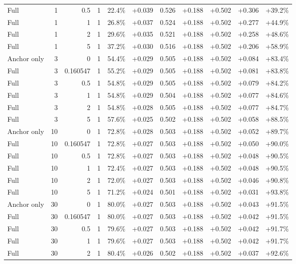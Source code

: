 \begin{table}[htbp]
\begin{tabular}{lrrrccccccc}
Full & 1 & 0.5 & 1 & 22.4\% & +0.039 & 0.526 & +0.188 & +0.502 & +0.306 & +39.2\% \\
Full & 1 & 1 & 1 & 26.8\% & +0.037 & 0.524 & +0.188 & +0.502 & +0.277 & +44.9\% \\
Full & 1 & 2 & 1 & 29.6\% & +0.035 & 0.521 & +0.188 & +0.502 & +0.258 & +48.6\% \\
Full & 1 & 5 & 1 & 37.2\% & +0.030 & 0.516 & +0.188 & +0.502 & +0.206 & +58.9\% \\
Anchor only & 3 & 0 & 1 & 54.4\% & +0.029 & 0.505 & +0.188 & +0.502 & +0.084 & +83.4\% \\
Full & 3 & 0.160547 & 1 & 55.2\% & +0.029 & 0.505 & +0.188 & +0.502 & +0.081 & +83.8\% \\
Full & 3 & 0.5 & 1 & 54.8\% & +0.029 & 0.505 & +0.188 & +0.502 & +0.079 & +84.2\% \\
Full & 3 & 1 & 1 & 54.8\% & +0.029 & 0.504 & +0.188 & +0.502 & +0.077 & +84.6\% \\
Full & 3 & 2 & 1 & 54.8\% & +0.028 & 0.505 & +0.188 & +0.502 & +0.077 & +84.7\% \\
Full & 3 & 5 & 1 & 57.6\% & +0.025 & 0.502 & +0.188 & +0.502 & +0.058 & +88.5\% \\
Anchor only & 10 & 0 & 1 & 72.8\% & +0.028 & 0.503 & +0.188 & +0.502 & +0.052 & +89.7\% \\
Full & 10 & 0.160547 & 1 & 72.8\% & +0.027 & 0.503 & +0.188 & +0.502 & +0.050 & +90.0\% \\
Full & 10 & 0.5 & 1 & 72.8\% & +0.027 & 0.503 & +0.188 & +0.502 & +0.048 & +90.5\% \\
Full & 10 & 1 & 1 & 72.4\% & +0.027 & 0.503 & +0.188 & +0.502 & +0.048 & +90.5\% \\
Full & 10 & 2 & 1 & 72.0\% & +0.027 & 0.503 & +0.188 & +0.502 & +0.046 & +90.8\% \\
Full & 10 & 5 & 1 & 71.2\% & +0.024 & 0.501 & +0.188 & +0.502 & +0.031 & +93.8\% \\
Anchor only & 30 & 0 & 1 & 80.0\% & +0.027 & 0.503 & +0.188 & +0.502 & +0.043 & +91.5\% \\
Full & 30 & 0.160547 & 1 & 80.0\% & +0.027 & 0.503 & +0.188 & +0.502 & +0.042 & +91.5\% \\
Full & 30 & 0.5 & 1 & 79.6\% & +0.027 & 0.503 & +0.188 & +0.502 & +0.042 & +91.7\% \\
Full & 30 & 1 & 1 & 79.6\% & +0.027 & 0.503 & +0.188 & +0.502 & +0.042 & +91.7\% \\
Full & 30 & 2 & 1 & 80.4\% & +0.026 & 0.502 & +0.188 & +0.502 & +0.037 & +92.6\% \\

\end{tabular}
\end{table}
